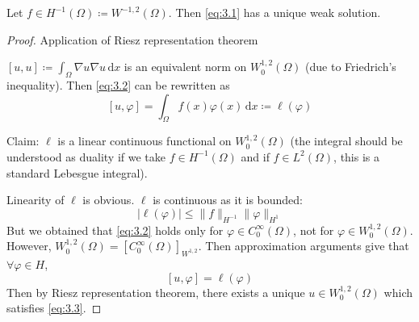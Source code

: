 \documentclass{report}
\begin{document}
\begin{theorem}{}{}
    Let \(f \in H^{-1}(\Omega) \coloneqq W^{-1, 2}(\Omega)\). Then \ref{eq:3.1} has a unique weak solution.
\end{theorem}

\begin{proof}{Application of Riesz representation theorem}

    \([u,u] \coloneqq \int_{\Omega} \nabla u \nabla u \,\mathrm{d}x\) is an equivalent norm on \(W^{1, 2}_{0}(\Omega)\) (due to Friedrich's inequality). Then \ref{eq:3.2} can be rewritten as
    \[
        [u, \varphi] = \int_{\Omega} f(x)\varphi(x) \,\mathrm{d}x \coloneqq \ell(\varphi)
    \]

    Claim: \(\ell\) is a linear continuous functional on \(W^{1, 2}_{0}(\Omega)\) (the integral should be understood as duality if we take \(f \in H^{-1}(\Omega)\) and if \(f \in L^{2}(\Omega)\), this is a standard Lebesgue integral).

    Linearity of \(\ell\) is obvious. \(\ell\) is continuous as it is bounded:
    \[
        \vert \ell(\varphi) \vert \leq \|f\|_{H^{-1}} \| \varphi \|_{H^{1}}
    \]
    But we obtained that \ref{eq:3.2} holds only for \(\varphi \in C^{\infty}_{0}(\Omega)\), not for \(\varphi \in W^{1, 2}_{0}(\Omega)\). However, \(W^{1, 2}_{0}(\Omega) = [C^{\infty}_{0}(\Omega)]_{W^{1, 2}}\). Then approximation arguments give that \(\forall \varphi \in H\), 
    \begin{equation}\label{eq:3.3}
        [u, \varphi] = \ell(\varphi)
    \end{equation}
    Then by Riesz representation theorem, there exists a unique \(u \in W^{1, 2}_{0}(\Omega)\) which satisfies \ref{eq:3.3}.
\end{proof}
\end{document}
